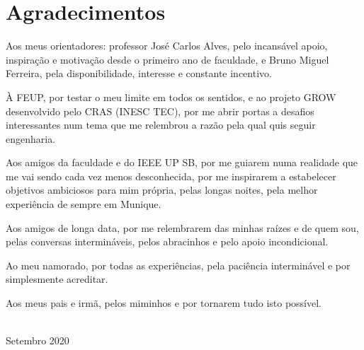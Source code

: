 \chapter*{Agradecimentos}
\noindent
Aos meus orientadores: professor José Carlos Alves, pelo incansável apoio, inspiração e motivação desde o primeiro ano de faculdade, e Bruno Miguel Ferreira, pela disponibilidade, interesse e constante incentivo.

\noindent
À FEUP, por testar o meu limite em todos os sentidos, e ao projeto GROW desenvolvido pelo CRAS (INESC TEC), por me abrir portas a desafios interessantes num tema que me relembrou a razão pela qual quis seguir engenharia.

\noindent
Aos amigos da faculdade e do IEEE UP SB, por me guiarem numa realidade que me vai sendo cada vez menos desconhecida, por me inspirarem a estabelecer objetivos ambiciosos para mim própria, pelas longas noites, pela melhor experiência de sempre em Munique.

\noindent
Aos amigos de longa data, por me relembrarem das minhas raízes e de quem sou, pelas conversas intermináveis, pelos abracinhos e pelo apoio incondicional.

\noindent
Ao meu namorado, por todas as experiências, pela paciência interminável e por simplesmente acreditar.

\noindent
Aos meus pais e irmã, pelos miminhos e por tornarem tudo isto possível.

\vspace{10mm}
\\ 
Setembro 2020
